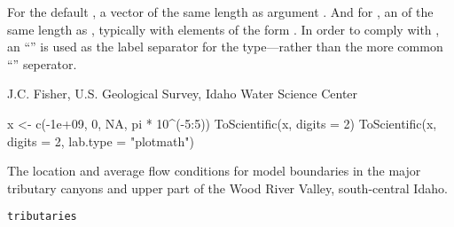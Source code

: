 \documentclass[letterpaper]{book}
\begin{document}
%
\begin{Value}
For the default , a  vector of the same length as argument .
And for , an  of the same length as , typically with elements of the form .
In order to comply with ,
an ``'' is used as the label separator for the  type---rather than the more common ``\code{\%*\%}'' seperator.
\end{Value}
%
\begin{Author}\relax
J.C. Fisher, U.S. Geological Survey, Idaho Water Science Center
\end{Author}
%
\begin{Examples}
\begin{ExampleCode}
x <- c(-1e+09, 0, NA, pi * 10^(-5:5))
ToScientific(x, digits = 2)
ToScientific(x, digits = 2, lab.type = "plotmath")
\end{ExampleCode}
\end{Examples}
%
\begin{Description}\relax
The location and average flow conditions for model boundaries in the major tributary canyons and upper part of the Wood River Valley, south-central Idaho.
\end{Description}
%
\begin{Usage}
\begin{verbatim}
tributaries
\end{verbatim}
\end{Usage}
%
\end{document}
